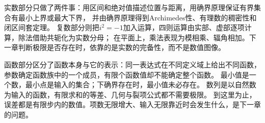 实数部分只做了两件事：用区间和绝对值描述位置与距离，用确界原理保证有界集合有最小上界或最大下界，
并由确界原理得到Archimedes性、有理数的稠密性和闭区间套定理。
复数部分则把$i^2=-1$加入运算，四则运算由实部、虚部逐项计算，除法借助共轭化为实数分母；
在平面上，乘法表现为模相乘、辐角相加。下一章判断极限是否存在时，依靠的是实数的完备性，而不是数值图像。

函数部分区分了函数本身与它的表示：同一表达式在不同定义域上给出不同函数，参数确定函数族中的一个成员，有限个函数值却不能确定整个函数。
最小值是一个数，最小点是输入的集合；下确界存在时，最小值未必存在。
数列是以自然数为输入的函数，有限求和的等差、几何与裂项公式都不需要极限。
到这里为止，误差都是有限步内的数值。项数无限增大、输入无限靠近时会发生什么，是下一章的问题。
